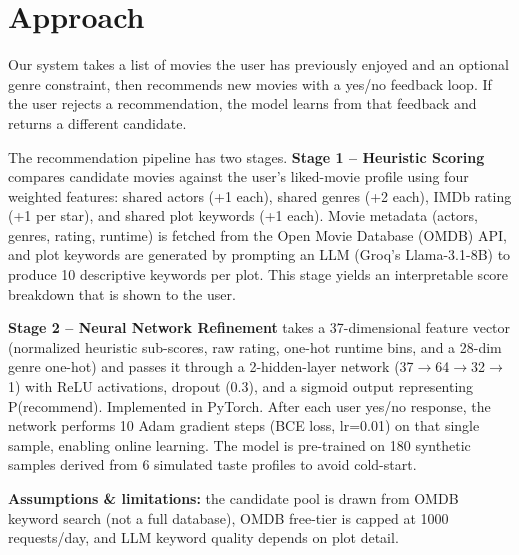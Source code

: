\documentclass[11pt, letterpaper]{article}
\begin{document}
\section{Approach}
\begin{tcolorbox}[sectionbox, height=7.0cm, valign=top]
    Our system takes a list of movies the user has previously enjoyed and an optional genre constraint, then recommends new movies with a yes/no feedback loop. If the user rejects a recommendation, the model learns from that feedback and returns a different candidate.

    The recommendation pipeline has two stages. \textbf{Stage 1 -- Heuristic Scoring} compares candidate movies against the user's liked-movie profile using four weighted features: shared actors (+1 each), shared genres (+2 each), IMDb rating (+1 per star), and shared plot keywords (+1 each). Movie metadata (actors, genres, rating, runtime) is fetched from the Open Movie Database (OMDB) API, and plot keywords are generated by prompting an LLM (Groq's Llama-3.1-8B) to produce 10 descriptive keywords per plot. This stage yields an interpretable score breakdown that is shown to the user.

    \textbf{Stage 2 -- Neural Network Refinement} takes a 37-dimensional feature vector (normalized heuristic sub-scores, raw rating, one-hot runtime bins, and a 28-dim genre one-hot) and passes it through a 2-hidden-layer network (37$\rightarrow$64$\rightarrow$32$\rightarrow$1) with ReLU activations, dropout (0.3), and a sigmoid output representing P(recommend). Implemented in PyTorch. After each user yes/no response, the network performs 10 Adam gradient steps (BCE loss, lr=0.01) on that single sample, enabling online learning. The model is pre-trained on 180 synthetic samples derived from 6 simulated taste profiles to avoid cold-start.

    \textbf{Assumptions \& limitations:} the candidate pool is drawn from OMDB keyword search (not a full database), OMDB free-tier is capped at 1000 requests/day, and LLM keyword quality depends on plot detail.
\end{tcolorbox}

\end{document}
